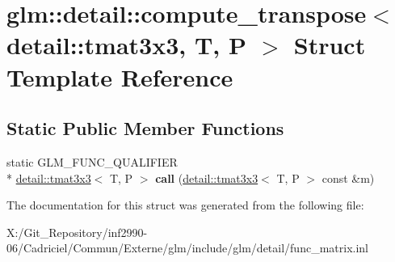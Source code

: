 \hypertarget{structglm_1_1detail_1_1compute__transpose_3_01detail_1_1tmat3x3_00_01_t_00_01_p_01_4}{\section{glm\-:\-:detail\-:\-:compute\-\_\-transpose$<$ detail\-:\-:tmat3x3, T, P $>$ Struct Template Reference}
\label{structglm_1_1detail_1_1compute__transpose_3_01detail_1_1tmat3x3_00_01_t_00_01_p_01_4}
}
\subsection*{Static Public Member Functions}
\begin{DoxyCompactItemize}
\item 
\hypertarget{structglm_1_1detail_1_1compute__transpose_3_01detail_1_1tmat3x3_00_01_t_00_01_p_01_4_aeb6e3f561dc927d220808c5267b65149}{static G\-L\-M\-\_\-\-F\-U\-N\-C\-\_\-\-Q\-U\-A\-L\-I\-F\-I\-E\-R \\*
\hyperlink{structglm_1_1detail_1_1tmat3x3}{detail\-::tmat3x3}$<$ T, P $>$ {\bfseries call} (\hyperlink{structglm_1_1detail_1_1tmat3x3}{detail\-::tmat3x3}$<$ T, P $>$ const \&m)}\label{structglm_1_1detail_1_1compute__transpose_3_01detail_1_1tmat3x3_00_01_t_00_01_p_01_4_aeb6e3f561dc927d220808c5267b65149}

\end{DoxyCompactItemize}


The documentation for this struct was generated from the following file\-:\begin{DoxyCompactItemize}
\item 
X\-:/\-Git\-\_\-\-Repository/inf2990-\/06/\-Cadriciel/\-Commun/\-Externe/glm/include/glm/detail/func\-\_\-matrix.\-inl\end{DoxyCompactItemize}
